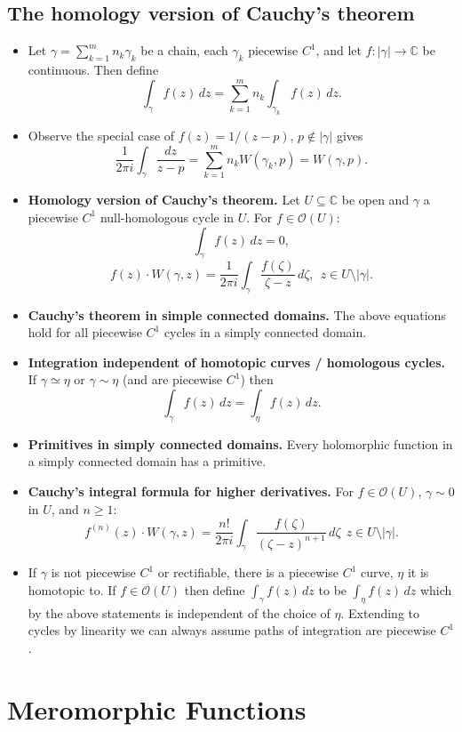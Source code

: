 \documentclass{article}
\newenvironment{topic}[1]{%
{\subsection{#1}}%
\begin{itemize}%
}{%
\end{itemize}%
}
\newcommand{\theorem}[1]{\item {\bf #1.}}
\newcommand{\corollary}[1]{\item {\bf #1.}}
\newcommand{\holo}[1]{\mathcal{O}(#1)}
\newcommand{\remark}{\item}
\begin{document}
\begin{topic}{The homology version of Cauchy's theorem}

\remark Let $\gamma = \sum_{k=1}^m n_k \gamma_k$ be a chain, each $\gamma_k$ piecewise $C^1$, and let $f : |\gamma| \to \mathbb{C}$ be continuous. Then define $$\int_\gamma f(z)\,dz = \sum_{k=1}^m n_k \int_{\gamma_k} f(z)\,dz.$$

\remark Observe the special case of $f(z) = 1/(z-p)$, $p \not\in |\gamma|$ gives $$\dfrac{1}{2 \pi i} \int_\gamma \dfrac{dz}{z - p} = \sum_{k=1}^m n_k W(\gamma_k, p) = W(\gamma, p).$$

\theorem{Homology version of Cauchy's theorem} Let $U \subseteq \mathbb{C}$ be open and $\gamma$ a piecewise $C^1$ null-homologous cycle in $U$. For $f \in \holo{U}$: $$\int_\gamma f(z)\,dz = 0,$$ $$f(z) \cdot W(\gamma, z) = \dfrac{1}{2 \pi i} \int_\gamma \dfrac{f(\zeta)}{\zeta - z}\,d\zeta,~~z \in U \setminus |\gamma|.$$

\corollary{Cauchy's theorem in simple connected domains} The above equations hold for all piecewise $C^1$ cycles in a simply connected domain.

\corollary{Integration independent of homotopic curves / homologous cycles} If $\gamma \simeq \eta$ or $\gamma \sim \eta$ (and are piecewise $C^1$) then $$\int_\gamma f(z)\,dz = \int_\eta f(z)\,dz.$$

\theorem{Primitives in simply connected domains} Every holomorphic function in a simply connected domain has a primitive.

\corollary{Cauchy's integral formula for higher derivatives} For $f \in \holo{U}$, $\gamma \sim 0$ in $U$, and $n \geq 1$: $$f^{(n)}(z) \cdot W(\gamma, z) = \dfrac{n!}{2 \pi i} \int_\gamma \dfrac{f(\zeta)}{(\zeta - z)^{n+1}}\,d\zeta~~z \in U \setminus |\gamma|.$$

\remark If $\gamma$ is not piecewise $C^1$ or rectifiable, there is a piecewise $C^1$ curve, $\eta$ it is homotopic to. If $f \in \holo{U}$ then define $\int_\gamma f(z)\,dz$ to be $\int_\eta f(z)\,dz$ which by the above statements is independent of the choice of $\eta$. Extending to cycles by linearity we can always assume paths of integration are piecewise $C^1$.

\end{topic}

\newpage
\section{Meromorphic Functions}
\end{document}
